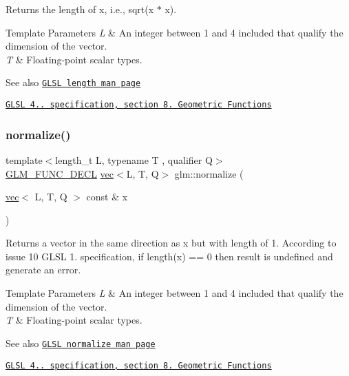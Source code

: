 Returns the length of x, i.\+e., sqrt(x $\ast$ x).


\begin{DoxyTemplParams}{Template Parameters}
{\em L} & An integer between 1 and 4 included that qualify the dimension of the vector. \\
\hline
{\em T} & Floating-\/point scalar types.\\
\hline
\end{DoxyTemplParams}
\begin{DoxySeeAlso}{See also}
\href{http://www.opengl.org/sdk/docs/manglsl/xhtml/length.xml}{\tt G\+L\+SL length man page} 

\href{http://www.opengl.org/registry/doc/GLSLangSpec.4.20.8.pdf}{\tt G\+L\+SL 4.. specification, section 8. Geometric Functions} 
\end{DoxySeeAlso}
\mbox{\label{group__core__func__geometric_ga3b8d3dcae77870781392ed2902cce597}} 
\subsubsection{\texorpdfstring{normalize()}{normalize()}}
{\footnotesize\ttfamily template$<$length\+\_\+t L, typename T , qualifier Q$>$ \\
\hyperlink{setup_8hpp_ab2d052de21a70539923e9bcbf6e83a51}{G\+L\+M\+\_\+\+F\+U\+N\+C\+\_\+\+D\+E\+CL} \hyperlink{structglm_1_1vec}{vec}$<$L, T, Q$>$ glm\+::normalize (\begin{DoxyParamCaption}\item[{\hyperlink{structglm_1_1vec}{vec}$<$ L, T, Q $>$ const \&}]{x }\end{DoxyParamCaption})}

Returns a vector in the same direction as x but with length of 1. According to issue 10 G\+L\+SL 1. specification, if length(x) == 0 then result is undefined and generate an error.


\begin{DoxyTemplParams}{Template Parameters}
{\em L} & An integer between 1 and 4 included that qualify the dimension of the vector. \\
\hline
{\em T} & Floating-\/point scalar types.\\
\hline
\end{DoxyTemplParams}
\begin{DoxySeeAlso}{See also}
\href{http://www.opengl.org/sdk/docs/manglsl/xhtml/normalize.xml}{\tt G\+L\+SL normalize man page} 

\href{http://www.opengl.org/registry/doc/GLSLangSpec.4.20.8.pdf}{\tt G\+L\+SL 4.. specification, section 8. Geometric Functions} 
\end{DoxySeeAlso}
\mbox{\label{group__core__func__geometric_ga5631dd1d5618de5450b1ea3cf3e94905}} 
